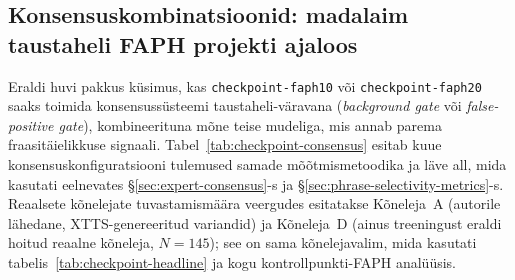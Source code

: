 \subsection{Konsensuskombinatsioonid: madalaim taustaheli FAPH projekti ajaloos}
\label{sec:checkpoint-consensus}

Eraldi huvi pakkus küsimus, kas \texttt{checkpoint-faph10} või \texttt{checkpoint-faph20} saaks toimida konsensussüsteemi taustaheli-väravana (\emph{background gate} või \emph{false-positive gate}), kombineerituna mõne teise mudeliga, mis annab parema fraasitäielikkuse signaali. Tabel~\ref{tab:checkpoint-consensus} esitab kuue konsensuskonfiguratsiooni tulemused samade mõõtmismetoodika ja läve all, mida kasutati eelnevates §\ref{sec:expert-consensus}-s ja §\ref{sec:phrase-selectivity-metrics}-s. Reaalsete kõnelejate tuvastamismäära veergudes esitatakse Kõneleja~A (autorile lähedane, XTTS-genereeritud variandid) ja Kõneleja~D (ainus treeningust eraldi hoitud reaalne kõneleja, $N=145$); see on sama kõnelejavalim, mida kasutati tabelis~\ref{tab:checkpoint-headline} ja kogu kontrollpunkti-FAPH analüüsis.

